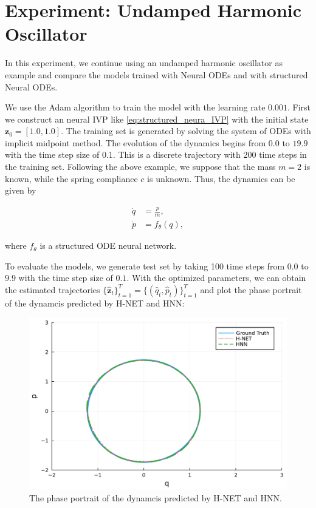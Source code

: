 \documentclass[
	parskip, 			   %
	twoside, 			   %
	DIV=14, 			   %
	BCOR=15.0mm, 		   %
	headsepline, 		   %
	open=right, 		   %
	captions=tableheading, %
	bibliography=totoc,    %
	numbers=noenddot       %
]{scrreprt}
\begin{document}
\section{Experiment: Undamped Harmonic Oscillator}
In this experiment, we continue using an undamped harmonic oscillator as example and compare the models trained with Neural ODEs and with structured Neural ODEs.

We use the Adam algorithm to train the model with the learning rate $0.001$. First we construct an neural IVP like \ref{eq:structured_neura_IVP} with the initial state $\mathbf{z}_0 = [1.0, 1.0]$. The training set is generated by solving the system of ODEs with implicit midpoint method. The evolution of the dynamics begins from $0.0$ to $19.9$ with the time step size of $0.1$. This is a discrete trajectory with 200 time steps in the training set. Following the above example, we suppose that the mass $m=2$ is known, while the spring compliance $c$ is unknown. Thus, the dynamics can be given by

\begin{equation}
    \label{eq:NeuralODE_udho}
    \begin{aligned}
        \dot{q}&=\frac{p}{m},\\
        \dot{p}&=f_{\theta}(q),
    \end{aligned}
\end{equation}

where $f_{\theta}$ is a structured ODE neural network.

To evaluate the models, we generate test set by taking 100 time steps from $0.0$ to $9.9$ with the time step size of $0.1$. With the optimized parameters, we can obtain the estimated trajectories $\{ \mathbf{\hat{z}}_{t} \}_{t=1}^{T} = \{ (\hat{q}_{t}, \hat{p}_{t}) \}_{t=1}^{T}$ and plot the phase portrait of the dynamcis predicted by H-NET and HNN:

\begin{figure}[h!]
    \centering
    \includegraphics[scale=0.5]{figures/phase_portrait_H_NET_and_HNN.pdf}
    \caption{The phase portrait of the dynamcis predicted by H-NET and HNN.}
    \label{fig:phase_portrait_H_NET_and_HNN}
\end{figure}
\end{document}
